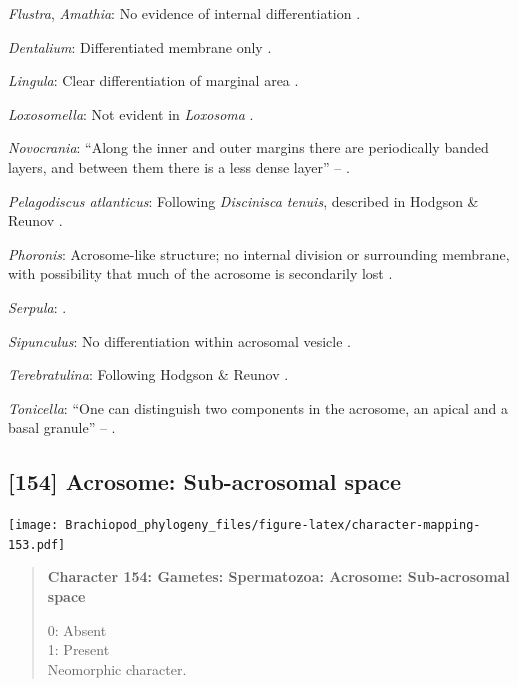 \documentclass[openany]{book}
\begin{document}
\hypertarget{Amathia-coding-153}{}
\emph{Flustra}, \emph{Amathia}: No evidence of internal differentiation
\citep[in \emph{Tubulipora};][]{Franzen1984}.

\hypertarget{Dentalium-coding-153}{}
\emph{Dentalium}: Differentiated membrane only \citep{DufresneDube1983}.

\hypertarget{Lingula-coding-153}{}
\emph{Lingula}: Clear differentiation of marginal area
\citep{Fukumoto2003Theacrosome}.

\hypertarget{Loxosomella-coding-153}{}
\emph{Loxosomella}: Not evident in \emph{Loxosoma} \citep{Franzen2000}.

\hypertarget{Novocrania-coding-153}{}
\emph{Novocrania}: ``Along the inner and outer margins there are
periodically banded layers, and between them there is a less dense
layer'' -- \citet{Afzelius1978Finestructure}.

\hypertarget{Pelagodiscus_atlanticus-coding-153}{}
\emph{Pelagodiscus atlanticus}: Following \emph{Discinisca}
\emph{tenuis}, described in Hodgson \& Reunov
\citeyearpar{Hodgson1994Ultrastructureof}.

\hypertarget{Phoronis-coding-153}{}
\emph{Phoronis}: Acrosome-like structure; no internal division or
surrounding membrane, with possibility that much of the acrosome is
secondarily lost \citep{Reunov2004Ultrastructuralstudy}.

\hypertarget{Serpula-coding-153}{}
\emph{Serpula}: \citet{Gherardi2011}.

\hypertarget{Sipunculus-coding-153}{}
\emph{Sipunculus}: No differentiation within acrosomal vesicle
\citep{Rice1993}.

\hypertarget{Terebratulina-coding-153}{}
\emph{Terebratulina}: Following Hodgson \& Reunov
\citeyearpar{Hodgson1994Ultrastructureof}.

\hypertarget{Tonicella-coding-153}{}
\emph{Tonicella}: ``One can distinguish two components in the acrosome,
an apical and a basal granule'' -- \citet{BucklandNicks1988}.

\subsection*{{[}154{]} Acrosome: Sub-acrosomal
space}\label{acrosome-sub-acrosomal-space}

\texttt{[image: Brachiopod\_phylogeny\_files/figure-latex/character-mapping-153.pdf]}

\begin{quote}
\textbf{Character 154: Gametes: Spermatozoa: Acrosome: Sub-acrosomal
space}

0: Absent\\
1: Present\\
Neomorphic character.
\end{quote}
\end{document}
